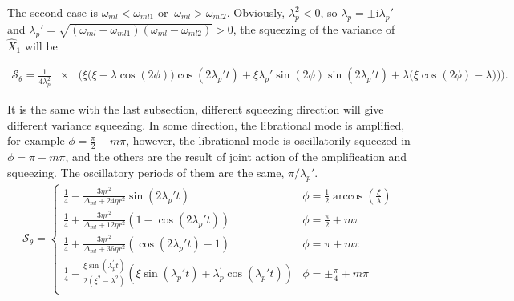 \documentclass[pra,aps,superscriptaddress,showpacs,preprint]{revtex4}%
\begin{document}
The second case is $\omega_{ml}<\omega_{ml1}$ or $~\omega_{ml}>\omega_{ml2}$. Obviously, $\lambda_{p}^{2}<0$, so
$\lambda_{p}=\pm\mathrm{i}\lambda_{p}'$ and $\lambda_{p}'=\sqrt{(\omega_{ml}-\omega_{ml1})(\omega_{ml}-\omega_{ml2})}>0$, the squeezing of the variance of $\hat{X}_{1}$ will be
\begin{widetext}
\begin{eqnarray}
\mathcal{S}_{\theta}=\frac{1}{4\lambda_{p}^{2}}&\times&\Big( \xi\big(\xi-\lambda\cos(2\phi)\big)\cos(2\lambda_{p}'t)+\xi\lambda_{p}'\sin(2\phi)\sin(2\lambda_{p}'t)+\lambda\big(\xi\cos(2\phi)-\lambda)\big)\Big)
\label{Eq:simplify squeezing rate 2}.
\end{eqnarray}
\end{widetext}
 It is the same with the last subsection, different squeezing direction will give different variance squeezing. In some direction, the librational mode is amplified, for example $\phi=\frac{\pi}{2}+m\pi$, however, the librational mode is oscillatorily squeezed in $\phi=\pi+m\pi$,  and the others are the result of joint action of the amplification and squeezing. The oscillatory periods of them are the same, $\pi/\lambda_{p}'$.
 \begin{eqnarray}
 \mathcal{S}_{\theta}=
\begin{cases}
\frac{1}{4}-\frac{3\eta r^2}{\Delta_{ml}+24\eta r^{2}}\sin(2\lambda_{p}'t)& \phi=\frac{1}{2}\arccos(\frac{\xi}{\lambda})\\
\frac{1}{4}+\frac{3\eta r^2}{\Delta_{ml}+12\eta r^{2}}(1-\cos(2\lambda_{p}'t))  & \phi=\frac{\pi}{2}+m\pi\\
\frac{1}{4}+\frac{3\eta r^2}{\Delta_{ml}+36\eta r^{2}}(\cos(2\lambda_{p}'t)-1)  & \phi=\pi+m\pi\\
\frac{1}{4}-\frac{\xi\sin(\lambda_{p}^{'}t)}{2(\xi^2-\lambda^2)}(\xi\sin(\lambda_{p}'t)\mp\lambda_{p}^{'}\cos(\lambda_{p}'t))  & \phi=\pm\frac{\pi}{4}+m\pi\\
\end{cases}
 \label{Eq:oscillation squeezing rate}
 \end{eqnarray}
\end{document}
